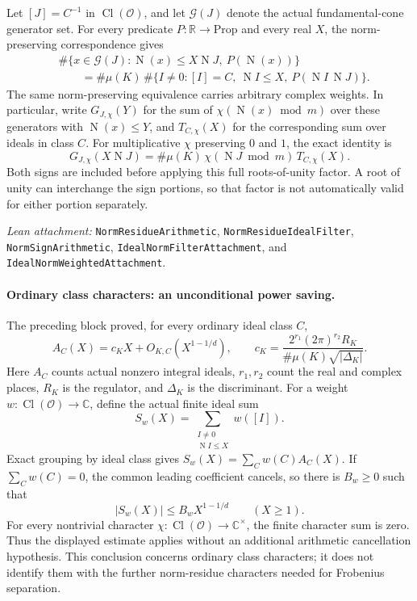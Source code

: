 \documentclass[11pt]{article}
\newcommand{\OO}{\mathcal O}
\newcommand{\RR}{\mathbb R}
\newcommand{\CC}{\mathbb C}
\newcommand{\Cl}{\operatorname{Cl}}
\newcommand{\Nm}{\operatorname N}
\newcommand{\absn}[1]{\lvert #1\rvert}
\begin{document}
Let $[J]=C^{-1}$ in $\Cl(\OO)$, and let $\mathcal G(J)$ denote the
actual fundamental-cone generator set. For every predicate $P:\RR\to\mathrm{Prop}$
and every real $X$, the norm-preserving correspondence gives
\begin{align*}
 &\#\{x\in\mathcal G(J):\Nm(x)\leq X\Nm J,\ P(\Nm(x))\}\\
 &\qquad=\#\mu(K)\,
 \#\{I\ne0:[I]=C,\ \Nm I\leq X,\ P(\Nm I\,\Nm J)\}.
\end{align*}
The same norm-preserving equivalence carries arbitrary complex weights.
In particular, write $G_{J,\chi}(Y)$ for the sum of
$\chi(\Nm(x)\bmod m)$ over these generators with $\Nm(x)\leq Y$, and
$T_{C,\chi}(X)$ for the corresponding sum over ideals in class $C$.
For multiplicative $\chi$ preserving $0$ and $1$, the exact identity is
\begin{equation}\label{eq:weighted-torsion}
 G_{J,\chi}(X\Nm J)
 =\#\mu(K)\,\chi(\Nm J\bmod m)\,T_{C,\chi}(X).
\end{equation}
Both signs are included before applying this full roots-of-unity factor.
A root of unity can interchange the sign portions, so that factor is not
automatically valid for either portion separately.

\smallskip
\noindent\emph{Lean attachment:}
\texttt{NormResidueArithmetic}, \texttt{NormResidueIdealFilter},
\texttt{NormSignArithmetic}, \texttt{IdealNormFilterAttachment}, and
\texttt{IdealNormWeightedAttachment}.

\newpage
\paragraph{Ordinary class characters: an unconditional power saving.}
The preceding block proved, for every ordinary ideal class $C$,
\[
 A_C(X)=c_KX+O_{K,C}(X^{1-1/d}),\qquad
 c_K=\frac{2^{r_1}(2\pi)^{r_2}R_K}{\#\mu(K)\sqrt{\absn{\Delta_K}}}.
\]
Here $A_C$ counts actual nonzero integral ideals, $r_1,r_2$ count the real
and complex places, $R_K$ is the regulator, and $\Delta_K$ is the discriminant. For a weight
$w:\Cl(\OO)\to\CC$, define the actual finite ideal sum
\[
 S_w(X)=\sum_{\substack{I\ne0\\\Nm I\leq X}}w([I]).
\]
Exact grouping by ideal class gives $S_w(X)=\sum_C w(C)A_C(X)$.
If $\sum_Cw(C)=0$, the common leading coefficient cancels, so there is
$B_w\geq0$ such that
\[
 \absn{S_w(X)}\leq B_wX^{1-1/d}\qquad(X\geq1).
\]
For every nontrivial character $\chi:\Cl(\OO)\to\CC^{\times}$,
the finite character sum is zero. Thus the displayed estimate applies
without an additional arithmetic cancellation hypothesis.
This conclusion concerns ordinary class characters; it does not identify
them with the further norm-residue characters needed for Frobenius separation.
\end{document}
